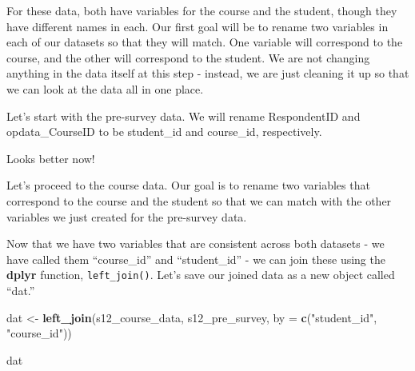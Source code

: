 \documentclass[]{book}
\newenvironment{Shaded}{\begin{snugshade}}{\end{snugshade}}
\newcommand{\KeywordTok}[1]{\textcolor[rgb]{0.13,0.29,0.53}{\textbf{#1}}}
\newcommand{\DataTypeTok}[1]{\textcolor[rgb]{0.13,0.29,0.53}{#1}}
\newcommand{\StringTok}[1]{\textcolor[rgb]{0.31,0.60,0.02}{#1}}
\newcommand{\OperatorTok}[1]{\textcolor[rgb]{0.81,0.36,0.00}{\textbf{#1}}}
\newcommand{\NormalTok}[1]{#1}
\begin{document}
For these data, both have variables for the course and the student,
though they have different names in each. Our first goal will be to
rename two variables in each of our datasets so that they will match.
One variable will correspond to the course, and the other will
correspond to the student. We are not changing anything in the data
itself at this step - instead, we are just cleaning it up so that we can
look at the data all in one place.

Let's start with the pre-survey data. We will rename RespondentID and
opdata\_CourseID to be student\_id and course\_id, respectively.

\begin{Shaded}
\end{Shaded}

Looks better now!

Let's proceed to the course data. Our goal is to rename two variables
that correspond to the course and the student so that we can match with
the other variables we just created for the pre-survey data.

\begin{Shaded}
\end{Shaded}

Now that we have two variables that are consistent across both datasets
- we have called them ``course\_id'' and ``student\_id'' - we can join
these using the \textbf{dplyr} function, \texttt{left\_join()}. Let's
save our joined data as a new object called ``dat.''

\begin{Shaded}
\begin{Highlighting}[]
\NormalTok{dat <-}\StringTok{ }\KeywordTok{left_join}\NormalTok{(s12_course_data, }
\NormalTok{                 s12_pre_survey, }
                 \DataTypeTok{by =} \KeywordTok{c}\NormalTok{(}\StringTok{"student_id"}\NormalTok{, }\StringTok{"course_id"}\NormalTok{))}

\NormalTok{dat}
\end{Highlighting}
\end{Shaded}
\end{document}
